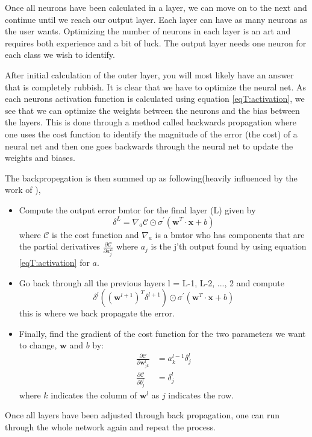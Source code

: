Once all neurons have been calculated in a layer, we can move on to the next and continue until we reach our output layer. Each layer can have as many neurons as the user wants. Optimizing the number of neurons in each layer is an art and requires both experience and a bit of luck. The output layer needs one neuron for each class we wish to identify.

After initial calculation of the outer layer, you will most likely have an answer that is completely rubbish. It is clear that we have to optimize the neural net. As each neurons activation function is calculated using equation \eqref{eqT:activation}, we see that we can optimize the weights between the neurons and the bias between the layers. This is done through a method called backwards propagation where one uses the cost function to identify the magnitude of the error (the cost) of a neural net and then one goes backwards through the neural net to update the weights and biases.

The backpropegation is then summed up as following(heavily influenced by the work of \citet{Nielsen}),
\begin{itemize}
    \item Compute the output error bmtor for the final layer (L) given by
    \begin{equation*}
        \delta^L = \nabla_a \mathcal{C} \odot \sigma^{'}(\bm{w}^T \cdot \bm{x} + b)
    \end{equation*}
    where $\mathcal{C}$ is the cost function and $\nabla_a$ is a bmtor who has components that are the partial derivatives $\frac{\partial \mathcal{C}}{\partial a_j^L}$ where $a_j$ is the j'th output found by using equation \eqref{eqT:activation} for $a$.
    \item Go back through all the previous layers l = L-1, L-2, ..., 2 and compute
    \begin{equation*}
        \delta^l ((\bm{w}^{l + 1})^T \delta^{l + 1}) \odot \sigma^{'}(\bm{w}^T \cdot \bm{x} + b)
    \end{equation*}
    this is where we back propagate the error.
    \item Finally, find the gradient of the cost function for the two parameters we want to change, $\bm{w}$ and $b$ by:
    \begin{align*}
        \frac{\partial \mathcal{C}}{\partial \bm{w}_{jk}^l} &= a_k^{l-1}\delta_{j}^{l} \\
        \frac{\partial \mathcal{C}}{\partial b_{j}^l} &= \delta_{j}^{l}
    \end{align*}
    where $k$ indicates the column of $\bm{w}^l$ as $j$ indicates the row.
\end{itemize}
Once all layers have been adjusted through back propagation, one can run through the whole network again and repeat the process.

